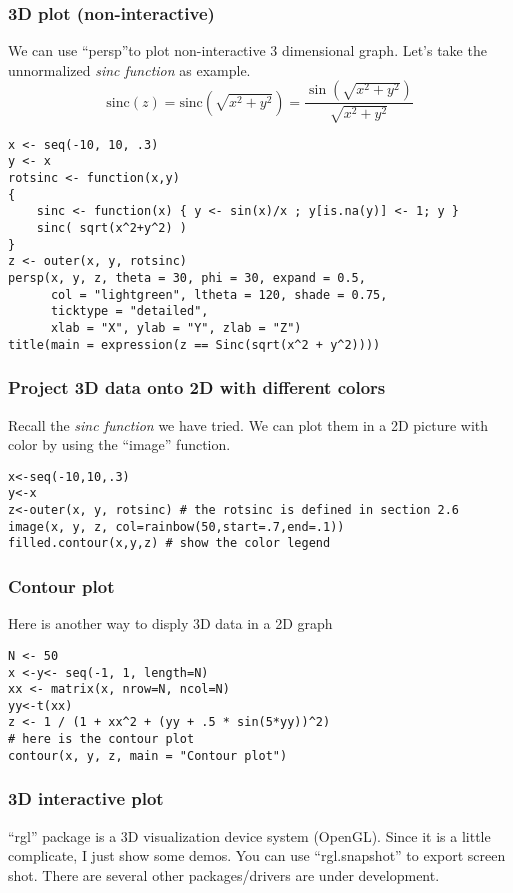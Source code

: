 \documentclass[10pt]{beamer}
\begin{document}
\begin{frame}
  \frametitle{3D plot (non-interactive)}
  We can use ``persp''to plot non-interactive 3 dimensional
  graph. Let's take the unnormalized {\em sinc function} as example.
  \[
  \text{sinc}\left( z \right) = \text{sinc}\left( {\sqrt {x^2 + y^2 }
    } \right) = \frac{{\sin \left( {\sqrt {x^2 + y^2 } } \right)}}
  {{\sqrt {x^2 + y^2 } }}
  \]
\end{frame}

\begin{frame}[fragile]
\begin{verbatim}
x <- seq(-10, 10, .3)
y <- x
rotsinc <- function(x,y)
{
    sinc <- function(x) { y <- sin(x)/x ; y[is.na(y)] <- 1; y }
    sinc( sqrt(x^2+y^2) )
}
z <- outer(x, y, rotsinc)
persp(x, y, z, theta = 30, phi = 30, expand = 0.5,
      col = "lightgreen", ltheta = 120, shade = 0.75,
      ticktype = "detailed",
      xlab = "X", ylab = "Y", zlab = "Z")
title(main = expression(z == Sinc(sqrt(x^2 + y^2))))
\end{verbatim}
\end{frame}


\begin{frame}[fragile]
  \frametitle{Project 3D data onto 2D with different colors}


  Recall the {\em sinc function} we have tried. We can plot them in a
  2D picture with color by using the ``image'' function.
\begin{verbatim}
x<-seq(-10,10,.3)
y<-x
z<-outer(x, y, rotsinc) # the rotsinc is defined in section 2.6
image(x, y, z, col=rainbow(50,start=.7,end=.1))
filled.contour(x,y,z) # show the color legend
\end{verbatim}
\end{frame}


\begin{frame}[fragile]
  \frametitle{Contour plot}
  Here is another way to disply 3D data in a 2D graph
\begin{verbatim}
N <- 50
x <-y<- seq(-1, 1, length=N)
xx <- matrix(x, nrow=N, ncol=N)
yy<-t(xx)
z <- 1 / (1 + xx^2 + (yy + .5 * sin(5*yy))^2)
# here is the contour plot
contour(x, y, z, main = "Contour plot")
\end{verbatim}
\end{frame}


\begin{frame}
  \frametitle{3D interactive plot}
  ``rgl'' package is a 3D visualization device system (OpenGL). Since
  it is a little complicate, I just show some demos. You can use
  ``rgl.snapshot'' to export screen shot.  There are several other
  packages/drivers are under development.
\end{frame}
\end{document}
